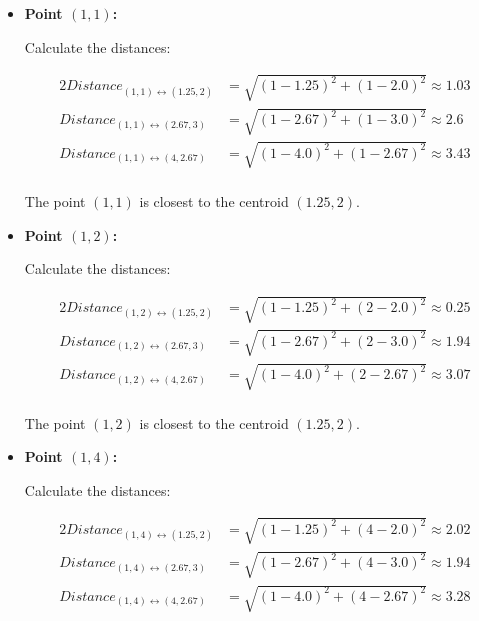 \documentclass[
english,
smallborders
]{i6prcsht}
\begin{document}
\begin{solution}
\begin{enumerate}
		      \begin{itemize}
			      \item \textbf{Point $(1,1)$:}
			            
			            Calculate the distances:
			            
			            \begin{alignat*}{2}
				            Distance_{(1,1)\leftrightarrow(1.25,2)} & = \sqrt{(1-1.25)^2+(1-2.0)^2} \approx 1.03 \\
				            Distance_{(1,1)\leftrightarrow(2.67,3)} & = \sqrt{(1-2.67)^2+(1-3.0)^2} \approx 2.6  \\
				            Distance_{(1,1)\leftrightarrow(4,2.67)} & = \sqrt{(1-4.0)^2+(1-2.67)^2} \approx 3.43 \\
			            \end{alignat*}
			            
			            The point $(1,1)$ is closest to the centroid $(1.25,2)$.
			            
			      \item \textbf{Point $(1,2)$:}
			            
			            Calculate the distances:
			            
			            \begin{alignat*}{2}
				            Distance_{(1,2)\leftrightarrow(1.25,2)} & = \sqrt{(1-1.25)^2+(2-2.0)^2} \approx 0.25 \\
				            Distance_{(1,2)\leftrightarrow(2.67,3)} & = \sqrt{(1-2.67)^2+(2-3.0)^2} \approx 1.94 \\
				            Distance_{(1,2)\leftrightarrow(4,2.67)} & = \sqrt{(1-4.0)^2+(2-2.67)^2} \approx 3.07 \\
			            \end{alignat*}
			            
			            The point $(1,2)$ is closest to the centroid $(1.25,2)$.
			            
			      \item \textbf{Point $(1,4)$:}
			            
			            Calculate the distances:
			            
			            \begin{alignat*}{2}
				            Distance_{(1,4)\leftrightarrow(1.25,2)} & = \sqrt{(1-1.25)^2+(4-2.0)^2} \approx 2.02 \\
				            Distance_{(1,4)\leftrightarrow(2.67,3)} & = \sqrt{(1-2.67)^2+(4-3.0)^2} \approx 1.94 \\
				            Distance_{(1,4)\leftrightarrow(4,2.67)} & = \sqrt{(1-4.0)^2+(4-2.67)^2} \approx 3.28 \\
			            \end{alignat*}
			            

\end{itemize}
\end{enumerate}
\end{solution}
\end{document}
